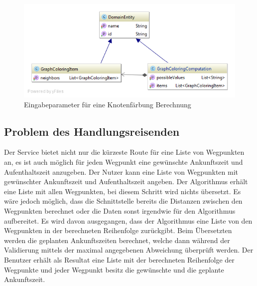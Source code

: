 \begin{figure}[h]
\centering
\includegraphics[scale=0.5]{images/probleme/graphcoloring.png}
\caption[Eingabeparameter für eine Knotenfärbung Berechnung]{Eingabeparameter für eine Knotenfärbung Berechnung \selfmade{}}
\label{fig:graphcoloring_input}
\end{figure}

%
%
%
%

\subsection{Problem des Handlungsreisenden}
Der Service bietet nicht nur die kürzeste Route für eine Liste von Wegpunkten an, es ist auch möglich für jeden Wegpunkt eine gewünschte Ankunftszeit und Aufenthaltszeit anzugeben. Der 
Nutzer kann eine Liste von Wegpunkten mit gewünschter Ankunftszeit und Aufenthaltszeit angeben. Der Algorithmus erhält eine Liste mit allen Wegpunkten, bei diesem Schritt wird nichts 
übersetzt. Es wäre jedoch möglich, dass die Schnittstelle bereits die Distanzen zwischen den Wegpunkten berechnet oder die Daten sonst irgendwie für den Algorithmus aufbereitet. Es wird 
davon ausgegangen, dass der Algorithmus eine Liste von den Wegpunkten in der berechneten Reihenfolge zurückgibt. Beim Übersetzten werden die geplanten Ankunftszeiten berechnet, 
welche dann während der Validierung mittels der maximal angegebenen Abweichung überprüft werden. Der Benutzer erhält als Resultat eine Liste mit der berechneten Reihenfolge der 
Wegpunkte und jeder Wegpunkt besitz die gewünschte und die geplante Ankunftszeit.

